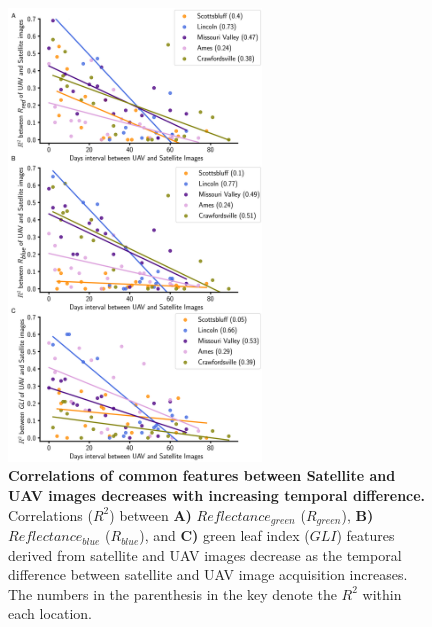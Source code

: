 \documentclass[12pt,twoside]{gsag3jnl}
\begin{document}
\begin{figure}[h!]
\centering
\includegraphics[width=0.6\textwidth]{SupplementalFigures/Figure1_supplementary.png}
\caption{\textbf{Correlations of common features between Satellite and UAV images decreases with increasing temporal difference.} Correlations ($R^2$) between \textbf{A)} $Reflectance_{green}$ ($R_{green}$), \textbf{B)} $Reflectance_{blue}$ ($R_{blue}$), and \textbf{C)} green leaf index ($GLI$) features derived from satellite and UAV images decrease as the temporal difference between satellite and UAV image acquisition increases. The numbers in the parenthesis in the key denote the $R^2$ within each location.
}
\label{fig:SatUAV_correlation}
\end{figure}
\end{document}
